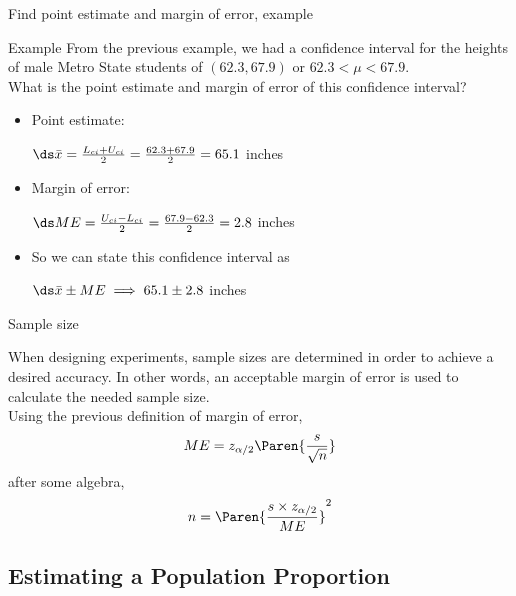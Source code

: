 \documentclass[xcolor=table]{beamer}
\begin{document}
\begin{frame}{Find point estimate and margin of error, example}
\begin{exampleblock}{Example}
From the previous example, we had a confidence interval for the heights of male Metro State students of $(62.3, 67.9)$ or $62.3 < \mu < 67.9$.\\
\medskip
 What is the point estimate and margin of error of this confidence interval?\\
\medskip
\begin{itemize}
\pause\item Point estimate:\\
\smallskip
{\centering
$\ds \bar x = \frac {L_{ci} + U_{ci}}{2} = \frac {62.3 + 67.9}{2} = 65.1$ inches
\par}
\smallskip
\pause\item Margin of error:\\
\smallskip
{\centering
$\ds ME = \frac {U_{ci} - L_{ci}}{2} = \frac {67.9 - 62.3}{2} = 2.8$ inches
\par}
\smallskip
\pause\item So we can state this confidence interval as\\
\smallskip
{\centering
$\ds \bar x \pm ME \implies 65.1 \pm 2.8$ inches
\par}

\end{itemize}
\medskip
\end{exampleblock}

\end{frame}

\begin{frame}{Sample size}
\begin{block}{}
\large
When designing experiments, sample sizes are determined in order to achieve a desired accuracy. In other words, an acceptable margin of error is used to calculate the needed sample size.\\
\pause\medskip
Using the previous definition of margin of error,
\[ME = z_{\alpha/2} \Paren{\frac s {\sqrt n}}\]
after some algebra,
\[ n = \Paren{\frac {s \times z_{\alpha/2}}{ME}}^2\]
\end{block}
\end{frame}

\subsection{Estimating a Population Proportion}
\end{document}
